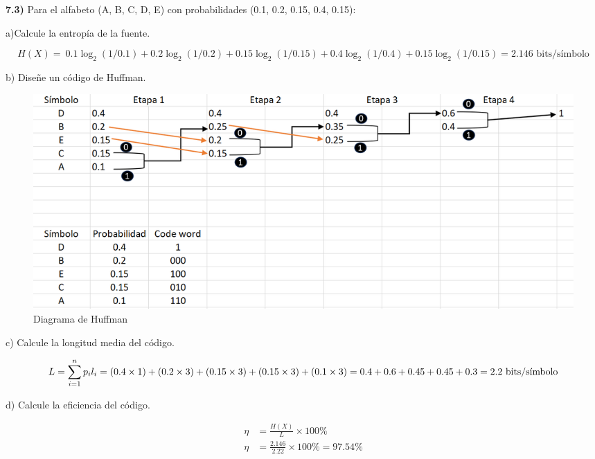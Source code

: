 \bigskip

\noindent \textbf{7.3)} Para el alfabeto (A, B, C, D, E) con probabilidades (0.1, 0.2, 0.15, 0.4, 0.15):\par

\noindent a)Calcule la entropía de la fuente. \par
\bigskip
\noindent \begin{equation*}
H(X) = \ 0.1 \log_2 (1/0.1) + 0.2 \log_2 (1/0.2) + 0.15 \log_2 (1/0.15) + 0.4 \log_2 (1/0.4) + 0.15 \log_2 (1/0.15) = 2.146 \text{ bits/símbolo}
\end{equation*}



\noindent b) Diseñe un código de Huffman. \par

\begin{figure}[H]
    \centering
    \includegraphics[width=0.8\linewidth]{Captura de pantalla 2025-09-08 164244.png}
    \caption{Diagrama de Huffman}
    \label{fig:placeholder}
\end{figure}

\noindent c) Calcule la longitud media del código. \par
\bigskip
\noindent \begin{equation*}
L = \sum_{i=1}^{n} p_i l_i= \\(0.4 \times 1) + (0.2 \times 3) + (0.15 \times 3) + (0.15 \times 3) + (0.1 \times 3) \\
= 0.4 + 0.6 + 0.45 + 0.45 + 0.3 = 2.2 \text{ bits/símbolo}
\end{equation*}

\noindent d) Calcule la eficiencia del código. \par

\begin{align*}
\eta &= \frac{H(X)}{L} \times 100\% \\
\eta &= \frac{2.146}{2.22} \times 100\% = 97.54\%
\end{align*}
